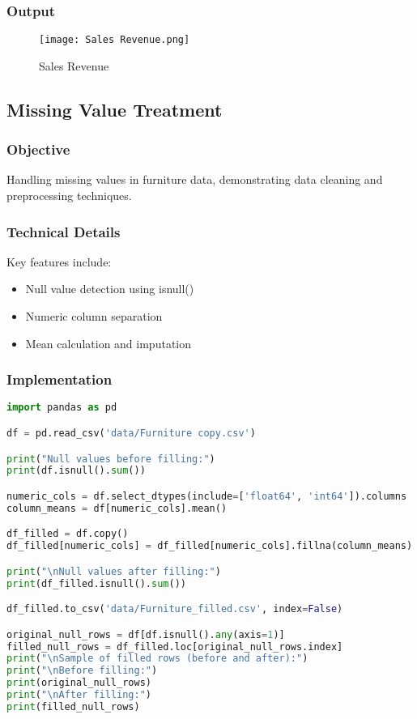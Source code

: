 \documentclass[12pt]{article}
\begin{document}
\subsubsection{Output}

\begin{figure}[h]
    \centering
    \texttt{[image: Sales Revenue.png]}
    \caption{Sales Revenue}
    \label{fig:enter-label}
\end{figure}


\subsection{Missing Value Treatment\hfill\href{https://github.com/sabbirahmed404/Python-Practice/blob/main/pandas_2.py}{\faGithub}}
\subsubsection{Objective}
Handling missing values in furniture data, demonstrating data cleaning and preprocessing techniques.

\subsubsection{Technical Details}
Key features include:
\begin{itemize}
    \item Null value detection using isnull()
    \item Numeric column separation
    \item Mean calculation and imputation
\end{itemize}

\subsubsection{Implementation}
\begin{lstlisting}[language=Python, caption=Missing Value Treatment Implementation]
import pandas as pd

df = pd.read_csv('data/Furniture copy.csv')

print("Null values before filling:")
print(df.isnull().sum())

numeric_cols = df.select_dtypes(include=['float64', 'int64']).columns
column_means = df[numeric_cols].mean()

df_filled = df.copy()
df_filled[numeric_cols] = df_filled[numeric_cols].fillna(column_means)

print("\nNull values after filling:")
print(df_filled.isnull().sum())

df_filled.to_csv('data/Furniture_filled.csv', index=False)

original_null_rows = df[df.isnull().any(axis=1)]
filled_null_rows = df_filled.loc[original_null_rows.index]
print("\nSample of filled rows (before and after):")
print("\nBefore filling:")
print(original_null_rows)
print("\nAfter filling:")
print(filled_null_rows)
\end{lstlisting}
\clearpage
\end{document}
